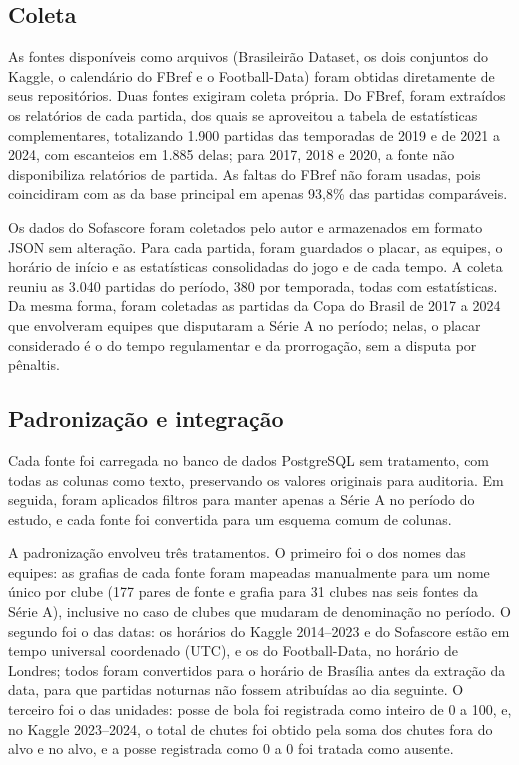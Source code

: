 \subsection{Coleta}\label{subsec:Coleta}

As fontes disponíveis como arquivos (Brasileirão Dataset, os dois conjuntos do Kaggle, o calendário do FBref e o Football-Data) foram obtidas diretamente de seus repositórios. Duas fontes exigiram coleta própria. Do FBref, foram extraídos os relatórios de cada partida, dos quais se aproveitou a tabela de estatísticas complementares, totalizando 1.900 partidas das temporadas de 2019 e de 2021 a 2024, com escanteios em 1.885 delas; para 2017, 2018 e 2020, a fonte não disponibiliza relatórios de partida. As faltas do FBref não foram usadas, pois coincidiram com as da base principal em apenas 93,8\% das partidas comparáveis.

Os dados do Sofascore foram coletados pelo autor e armazenados em formato JSON sem alteração. Para cada partida, foram guardados o placar, as equipes, o horário de início e as estatísticas consolidadas do jogo e de cada tempo. A coleta reuniu as 3.040 partidas do período, 380 por temporada, todas com estatísticas. Da mesma forma, foram coletadas as partidas da Copa do Brasil de 2017 a 2024 que envolveram equipes que disputaram a Série A no período; nelas, o placar considerado é o do tempo regulamentar e da prorrogação, sem a disputa por pênaltis.

\subsection{Padronização e integração}\label{subsec:Integracao}

Cada fonte foi carregada no banco de dados PostgreSQL sem tratamento, com todas as colunas como texto, preservando os valores originais para auditoria. Em seguida, foram aplicados filtros para manter apenas a Série A no período do estudo, e cada fonte foi convertida para um esquema comum de colunas.

A padronização envolveu três tratamentos. O primeiro foi o dos nomes das equipes: as grafias de cada fonte foram mapeadas manualmente para um nome único por clube (177 pares de fonte e grafia para 31 clubes nas seis fontes da Série A), inclusive no caso de clubes que mudaram de denominação no período. O segundo foi o das datas: os horários do Kaggle 2014--2023 e do Sofascore estão em tempo universal coordenado (UTC), e os do Football-Data, no horário de Londres; todos foram convertidos para o horário de Brasília antes da extração da data, para que partidas noturnas não fossem atribuídas ao dia seguinte. O terceiro foi o das unidades: posse de bola foi registrada como inteiro de 0 a 100, e, no Kaggle 2023--2024, o total de chutes foi obtido pela soma dos chutes fora do alvo e no alvo, e a posse registrada como 0 a 0 foi tratada como ausente.

